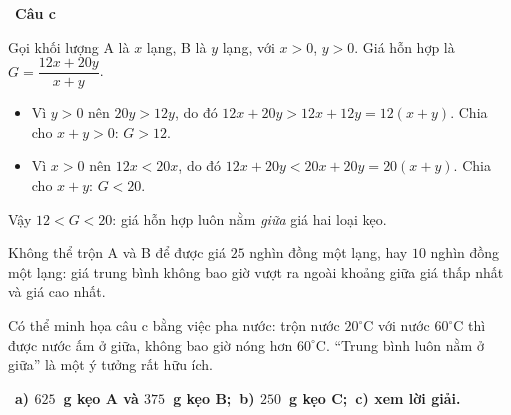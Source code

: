 \documentclass[11pt]{article}
\providecommand{\AnsWord}{Đáp số}
\newcommand{\ans}[1]{\par\smallskip{\bfseries\color{tmGreen!88!black}\AnsWord:}\ {\bfseries\color{AnsRed}#1}\par}
\newcommand{\step}[2]{\par\smallskip\noindent{\bfseries\color{tmBlue!85!black}\StepWord~#1.}\ {\bfseries #2}\par\nopagebreak}
\def\AnsWord{Đáp số}
\def\StepWord{Bước}
\begin{document}
{\step{4}{Câu c}
Gọi khối lượng A là $x$ lạng, B là $y$ lạng, với $x>0$, $y>0$. Giá hỗn hợp là $G=\dfrac{12x+20y}{x+y}$.
\begin{itemize}[leftmargin=1.3em,itemsep=1pt]
\item Vì $y>0$ nên $20y>12y$, do đó $12x+20y>12x+12y=12(x+y)$. Chia cho $x+y>0$: $G>12$.
\item Vì $x>0$ nên $12x<20x$, do đó $12x+20y<20x+20y=20(x+y)$. Chia cho $x+y$: $G<20$.
\end{itemize}
Vậy $12<G<20$: giá hỗn hợp luôn nằm \emph{giữa} giá hai loại kẹo.
\begin{warnbox}Không thể trộn A và B để được giá $25$ nghìn đồng một lạng, hay $10$ nghìn đồng một lạng: giá trung bình không bao giờ vượt ra ngoài khoảng giữa giá thấp nhất và giá cao nhất.\end{warnbox}
\begin{parentbox}Có thể minh họa câu c bằng việc pha nước: trộn nước $20^\circ$C với nước $60^\circ$C thì được nước ấm ở giữa, không bao giờ nóng hơn $60^\circ$C. ``Trung bình luôn nằm ở giữa'' là một ý tưởng rất hữu ích.\end{parentbox}
\ans{a) $625$~g kẹo A và $375$~g kẹo B;\ b) $250$~g kẹo C;\ c) xem lời giải.}
}
\end{document}
